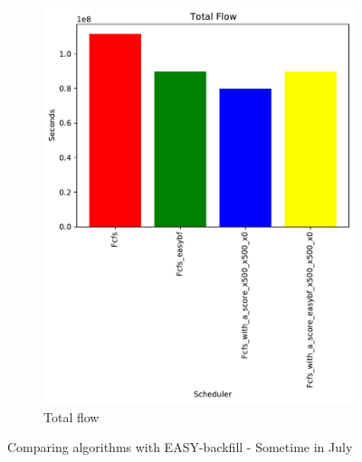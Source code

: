 \documentclass[a4paper]{article}
\begin{document}
\begin{figure}[H]
\begin{subfigure}[b]{0.4\linewidth}\centering\includegraphics[width=1\linewidth]{MBSS/plot/Backfill_2022-01-24->2022-01-24_Total_flow_450_128_32_256_4_1024.pdf}\caption{Total flow}\label{6}\end{subfigure}
\caption{Comparing algorithms with EASY-backfill - Sometime in July}\end{figure}
\end{document}

